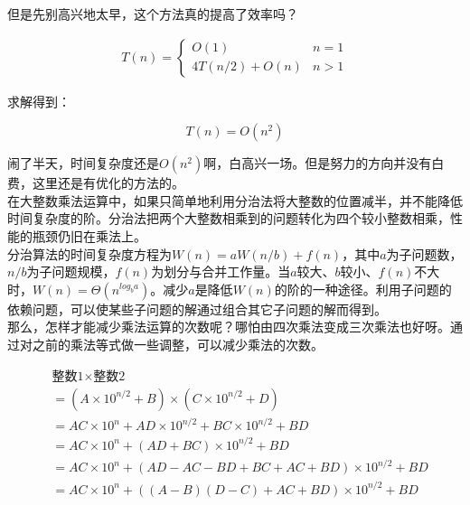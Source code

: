 但是先别高兴地太早，这个方法真的提高了效率吗？

\vspace{-0.5cm}

\begin{align*}
	T(n) = \begin{cases}
		O(1)           & n = 1 \\
		4T(n/2) + O(n) & n > 1
	\end{cases}
\end{align*}

求解得到：

\vspace{-0.5cm}

$$
	T(n) = O(n^2)
$$

闹了半天，时间复杂度还是$ O(n^2) $啊，白高兴一场。但是努力的方向并没有白费，这里还是有优化的方法的。\\

在大整数乘法运算中，如果只简单地利用分治法将大整数的位置减半，并不能降低时间复杂度的阶。分治法把两个大整数相乘到的问题转化为四个较小整数相乘，性能的瓶颈仍旧在乘法上。\\

分治算法的时间复杂度方程为$ W(n) = aW(n/b) + f(n) $，其中$ a $为子问题数，$ n / b $为子问题规模，$ f(n) $为划分与合并工作量。当$ a $较大、$ b $较小、$ f(n) $不大时，$ W(n) = \Theta(n^{log_ba}) $。减少$ a $是降低$ W(n) $的阶的一种途径。利用子问题的依赖问题，可以使某些子问题的解通过组合其它子问题的解而得到。\\

那么，怎样才能减少乘法运算的次数呢？哪怕由四次乘法变成三次乘法也好呀。通过对之前的乘法等式做一些调整，可以减少乘法的次数。

\vspace{-1cm}

\begin{align*}
	 & \text{整数1} \times \text{整数2}                                      \\
	 & = (A \times 10^{n/2} + B) \times (C \times 10^{n/2} + D)              \\
	 & = AC \times 10^n + AD \times 10^{n/2} + BC \times 10^{n/2} + BD       \\
	 & = AC \times 10^n + (AD + BC) \times 10^{n/2} + BD                     \\
	 & = AC \times 10^n + (AD - AC - BD + BC + AC + BD) \times 10^{n/2} + BD \\
	 & = AC \times 10^n + ((A - B)(D - C) + AC + BD) \times 10^{n/2} + BD
\end{align*}

